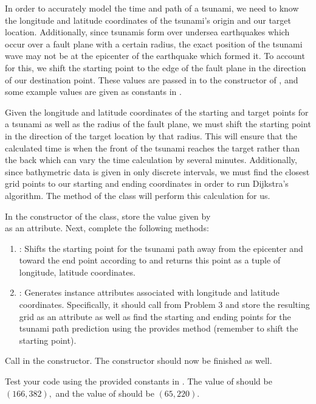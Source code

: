 In order to accurately model the time and path of a tsunami, we need to know the longitude and latitude coordinates of the tsunami's origin and our target location.
Additionally, since tsunamis form over undersea earthquakes which occur over a fault plane with a certain radius, the exact position of the tsunami wave may not be at the epicenter of the earthquake which formed it.
To account for this, we shift the starting point to the edge of the fault plane in the direction of our destination point.
These values are passed in to the constructor of , and some example values are given as constants in .

Given the longitude and latitude coordinates of the starting and target points for a tsunami as well as the radius of the fault plane, we must shift the starting point in the direction of the target location by that radius.
This will ensure that the calculated time is when the front of the tsunami reaches the target rather than the back which can vary the time calculation by several minutes.
Additionally, since bathymetric data is given in only discrete intervals, we must find the closest grid points to our starting and ending coordinates in order to run Dijkstra's algorithm.
The  method of the  class will perform this calculation for us.

\begin{problem}
In the constructor of the  class, store the value given by \\  as an attribute.
Next, complete the following methods:

\begin{enumerate}
    \item {}: Shifts the starting point for the tsunami path away from the epicenter and toward the end point according to  and returns this point as a tuple of longitude, latitude coordinates.
    \item {}: Generates instance attributes associated with longitude and latitude coordinates.
    Specifically, it should call  from Problem 3 and store the resulting grid as an attribute as well as find the starting and ending points for the tsunami path prediction using the provides  method (remember to shift the starting point).
    \end{enumerate}
    Call  in the  constructor. The constructor should now be finished as well.
\end{problem}
Test your code using the provided constants in .
The value of  should be $(166, 382),$ and the value of  should be $(65, 220).$

